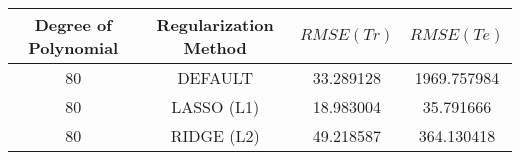 \begin{tabular}{cccc}
\toprule
 Degree of Polynomial & Regularization Method &  $RMSE(Tr)$ &   $RMSE(Te)$ \\
\midrule
                   80 &               DEFAULT &   33.289128 &  1969.757984 \\
                   80 &            LASSO (L1) &   18.983004 &    35.791666 \\
                   80 &            RIDGE (L2) &   49.218587 &   364.130418 \\
\bottomrule
\end{tabular}
